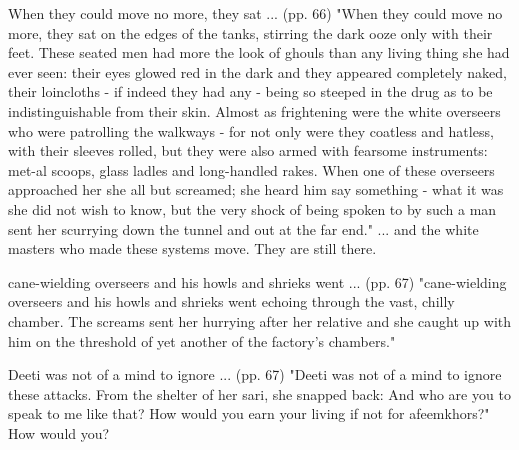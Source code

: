 When they could move no more, they sat ... (pp. 66)
"When they could move no more, they sat on the edges of the tanks, stirring the dark ooze only with their feet. These seated men had more the look of ghouls than any living thing she had ever seen: their eyes glowed red in the dark and they appeared completely naked, their loincloths - if indeed they had any - being so steeped in the drug as to be indistinguishable from their skin. Almost as frightening were the white overseers who were patrolling the walkways - for not only were they coatless and hatless, with their sleeves rolled, but they were also armed with fearsome instruments: met-al scoops, glass ladles and long-handled rakes. When one of these overseers approached her she all but screamed; she heard him say something - what it was she did not wish to know, but the very shock of being spoken to by such a man sent her scurrying down the tunnel and out at the far end."
... and the white masters who made these systems move. They are still there.

cane-wielding overseers and his howls and shrieks went ... (pp. 67)
"cane-wielding overseers and his howls and shrieks went echoing through the vast, chilly chamber. The screams sent her hurrying after her relative and she caught up with him on the threshold of yet another of the factory’s chambers."

Deeti was not of a mind to ignore ... (pp. 67)
"Deeti was not of a mind to ignore these attacks. From the shelter of her sari, she snapped back: And who are you to speak to me like that? How would you earn your living if not for afeemkhors?"
How would you?

